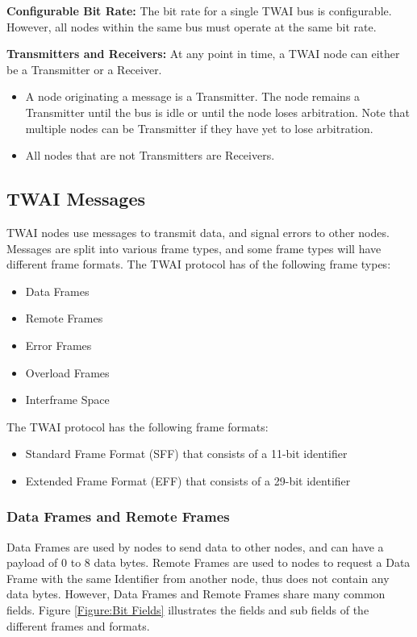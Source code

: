\documentclass[main\_\_EN.tex]{subfiles}
\begin{document}
{\bfseries Configurable Bit Rate:} The bit rate for a single TWAI bus is configurable. However, all nodes within the same bus must operate at the same bit rate.

{\bfseries Transmitters and Receivers:} At any point in time, a TWAI node can either be a Transmitter or a Receiver.
\begin{itemize}
    \item A node originating a message is a Transmitter. The node remains a Transmitter until the bus is idle or until the node loses arbitration. Note that multiple nodes can be Transmitter if they have yet to lose arbitration.
    \item All nodes that are not Transmitters are Receivers.
\end{itemize}

\subsection{TWAI Messages}
\label{subsubsec:twai-messages}
TWAI nodes use messages to transmit data, and signal errors to other nodes. Messages are split into various frame types, and some frame types will have different frame formats.
The TWAI protocol has of the following frame types:

\begin{itemize}
    \item Data Frames
    \item Remote Frames
    \item Error Frames
    \item Overload Frames
    \item Interframe Space
\end{itemize}

The TWAI protocol has the following frame formats:
\begin{itemize}
    \item Standard Frame Format (SFF) that consists of a 11-bit identifier
    \item Extended Frame Format (EFF) that consists of a 29-bit identifier
\end{itemize}

\subsubsection{Data Frames and Remote Frames}
Data Frames are used by nodes to send data to other nodes, and can have a payload of 0 to 8 data bytes. Remote Frames are used to nodes to request a Data Frame with the same Identifier from another node, thus does not contain any data bytes. However, Data Frames and Remote Frames share many common fields. Figure \ref{Figure:Bit Fields} illustrates the fields and sub fields of the different frames and formats.
\end{document}

